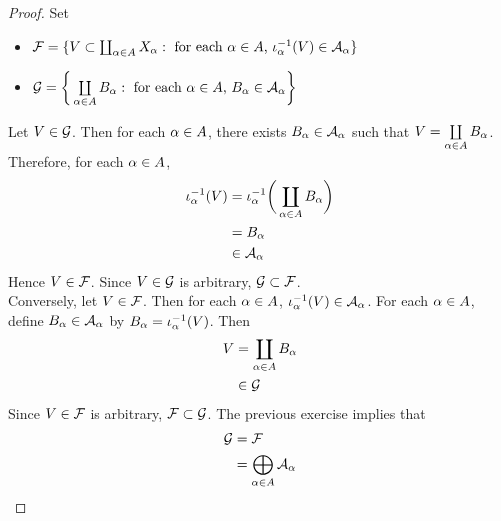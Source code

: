 \documentclass{book}
\begin{document}
	\begin{proof}
		Set  
		\begin{itemize}
			\item $\mathcal{F}= \{V \subset \coprod_{\alpha \in A}  X_{\alpha}: \text{ for each $\alpha \in A$, $\iota_{\alpha}^{-1}(V) \in \mathcal{A}_{\alpha}$}\}$ 
			\item $\mathcal{G} = \bigg \{  \coprod\limits_{\alpha \in A}  B_{\alpha}: \text{ for each $\alpha \in A$, } B_{\alpha} \in \mathcal{A}_{\alpha} \bigg\}$
			\end{itemize}
			Let $V \in \mathcal{G}$. Then for each $\alpha \in A$, there exists $B_{\alpha} \in \mathcal{A}_{\alpha}$ such that $V =  \coprod\limits_{\alpha \in A}  B_{\alpha}$. Therefore, for each $\alpha \in A$, 
			\begin{align*}
				\iota_{\alpha}^{-1}(V)
				& = \iota_{\alpha}^{-1} \bigg( \coprod\limits_{\alpha \in A}  B_{\alpha} \bigg) \\
				& = B_{\alpha} \\
				& \in \mathcal{A}_{\alpha}
			\end{align*}
			Hence $V \in \mathcal{F}$. Since $V \in \mathcal{G}$ is arbitrary, $\mathcal{G} \subset \mathcal{F}$. \\
			Conversely, let $V \in \mathcal{F}$. Then for each $\alpha \in A$, $\iota_{\alpha}^{-1}(V) \in \mathcal{A}_{\alpha}$. For each $\alpha \in A$, define $B_{\alpha} \in \mathcal{A}_{\alpha}$ by $B_{\alpha} = \iota_{\alpha}^{-1}(V)$. Then 
			\begin{align*}
				V 
				& = \coprod\limits_{\alpha \in A} B_{\alpha} \\
				& \in \mathcal{G} 
			\end{align*}
			Since $V \in \mathcal{F}$ is arbitrary, $\mathcal{F} \subset \mathcal{G}$. The previous exercise implies that 
			\begin{align*}
				\mathcal{G}
				& = \mathcal{F} \\
				& = \bigoplus\limits_{\alpha \in A} \mathcal{A}_{\alpha}
			\end{align*}
	\end{proof}
	
	
	
	
	
	
	
	
	
	
	
	
	
	
	
	
	
	
	
	
	
	
	
	
	
	
	
	
	
	
	
\end{document}

